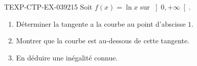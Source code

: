 \begin{exercice}{TEXP-CTP-EX-039}{2}{15}
Soit $f(x) = \ln x$ sur $\left]0, +\infty\right[$.
\begin{enumerate}
  \item Déterminer la tangente a la courbe au point d'abscisse $1$.
  \item Montrer que la courbe est au-dessous de cette tangente.
  \item En déduire une inégalité connue.
\end{enumerate}

\end{exercice}
